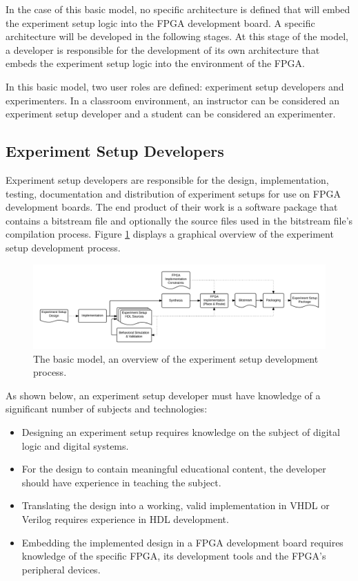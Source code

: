 \documentclass[openright]{template/uva-bachelor-thesis}
\begin{document}
In the case of this basic model, no specific architecture is defined that will embed the experiment setup logic into the FPGA development board. A specific architecture will be developed in the following stages. At this stage of the model, a developer is responsible for the development of its own architecture that embeds the experiment setup logic into the environment of the FPGA.

In this basic model, two user roles are defined: experiment setup developers and experimenters. In a classroom environment, an instructor can be considered an experiment setup developer and a student can be considered an experimenter. 

\subsection{Experiment Setup Developers}
\label{sectionexperimentdevelopers}
Experiment setup developers are responsible for the design, implementation, testing, documentation and distribution of experiment setups for use on FPGA development boards. The end product of their work is a software package that contains a bitstream file and optionally the source files used in the bitstream file's compilation process. Figure \ref{fig:process-development-basic} displays a graphical overview of the experiment setup development process. 

\begin{figure}[h]
    \centering
    \includegraphics[width=\textwidth]{img/processes-basic-development}
    \caption{The basic model, an overview of the experiment setup development process.}
    \label{fig:process-development-basic}
\end{figure}


As shown below, an experiment setup developer must have knowledge of a significant number of subjects and technologies: 

\begin{itemize}
\item Designing an experiment setup requires knowledge on the subject of digital logic and digital systems. 
\item For the design to contain meaningful educational content, the developer should have experience in teaching the subject. 
\item Translating the design into a working, valid implementation in VHDL or Verilog requires experience in HDL development.
\item Embedding the implemented design in a FPGA development board requires knowledge of the specific FPGA, its development tools and the FPGA's peripheral devices.
\end{itemize}
\end{document}
